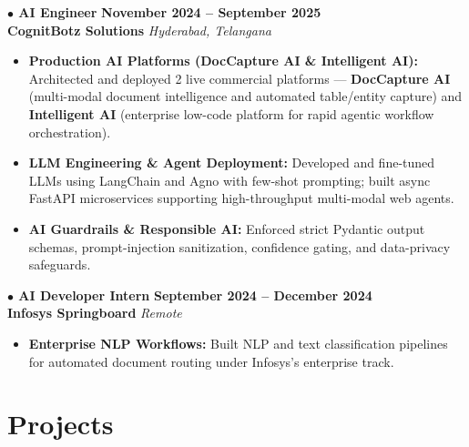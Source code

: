 \documentclass[a4paper,10pt]{article}
\begin{document}
\vspace{5pt}

\noindent
\textbf{\normalsize $\bullet$ AI Engineer} \hfill \textbf{November 2024 -- September 2025} \\
\textbf{CognitBotz Solutions} \hfill \textit{Hyderabad, Telangana}
\begin{itemize}
    \item \textbf{Production AI Platforms (DocCapture AI \& Intelligent AI):} Architected and deployed 2 live commercial platforms — \textbf{DocCapture AI} (multi-modal document intelligence and automated table/entity capture) and \textbf{Intelligent AI} (enterprise low-code platform for rapid agentic workflow orchestration).
    \item \textbf{LLM Engineering \& Agent Deployment:} Developed and fine-tuned LLMs using LangChain and Agno with few-shot prompting; built async FastAPI microservices supporting high-throughput multi-modal web agents.
    \item \textbf{AI Guardrails \& Responsible AI:} Enforced strict Pydantic output schemas, prompt-injection sanitization, confidence gating, and data-privacy safeguards.
\end{itemize}

\vspace{3pt}

\noindent
\textbf{\normalsize $\bullet$ AI Developer Intern} \hfill \textbf{September 2024 -- December 2024} \\
\textbf{Infosys Springboard} \hfill \textit{Remote}
\begin{itemize}
    \item \textbf{Enterprise NLP Workflows:} Built NLP and text classification pipelines for automated document routing under Infosys's enterprise track.
\end{itemize}

\section{Projects}
\end{document}
